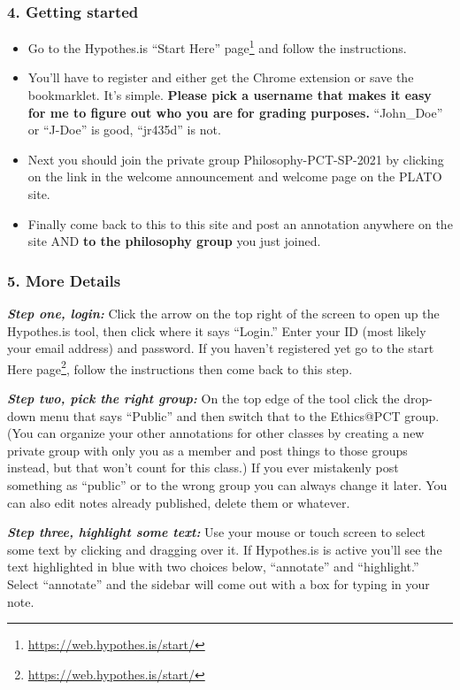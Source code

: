 \documentclass[
  12pt, openany]{book}
\renewcommand{\href}[2]{#2\footnote{\url{#1}}}
\begin{document}
\hypertarget{getting-started}{%
\subsubsection*{4. Getting started}\label{getting-started}}


\begin{itemize}
\item
  Go to the Hypothes.is \href{https://web.hypothes.is/start/}{``Start Here'' page} and follow the instructions.
\item
  You'll have to register and either get the Chrome extension or save the bookmarklet. It's simple. \textbf{Please pick a username that makes it easy for me to figure out who you are for grading purposes.} ``John\_Doe'' or ``J-Doe'' is good, ``jr435d'' is not.
\item
  Next you should join the private group Philosophy-PCT-SP-2021 by clicking on the link in the welcome announcement and welcome page on the PLATO site.
\item
  Finally come back to this to this site and post an annotation anywhere on the site AND \textbf{to the philosophy group} you just joined.
\end{itemize}

\hypertarget{more-details}{%
\subsubsection{5. More Details}\label{more-details}}

\textbf{\emph{Step one, login:}} Click the arrow on the top right of the screen to open up the Hypothes.is tool, then click where it says ``Login.'' Enter your ID (most likely your email address) and password. If you haven't registered yet go to the \href{https://web.hypothes.is/start/}{start Here page}, follow the instructions then come back to this step.

\textbf{\emph{Step two, pick the right group:}} On the top edge of the tool click the drop-down menu that says ``Public'' and then switch that to the Ethics@PCT group. (You can organize your other annotations for other classes by creating a new private group with only you as a member and post things to those groups instead, but that won't count for this class.) If you ever mistakenly post something as ``public'' or to the wrong group you can always change it later. You can also edit notes already published, delete them or whatever.

\textbf{\emph{Step three, highlight some text:}} Use your mouse or touch screen to select some text by clicking and dragging over it. If Hypothes.is is active you'll see the text highlighted in blue with two choices below, ``annotate'' and ``highlight.'' Select ``annotate'' and the sidebar will come out with a box for typing in your note.
\end{document}
